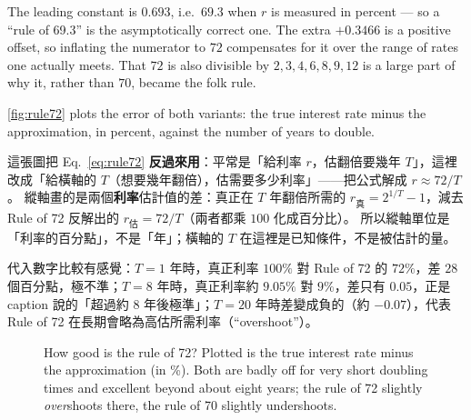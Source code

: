 \begin{remark}
	The leading constant is $0.693$, i.e.\ $69.3$ when $r$ is measured in percent --- so a ``rule of 69.3'' is the asymptotically correct one.
	The extra $+0.3466$ is a positive offset, so inflating the numerator to $72$ compensates for it over the range of rates one actually meets.
	That $72$ is also divisible by $2,3,4,6,8,9,12$ is a large part of why it, rather than $70$, became the folk rule.
\end{remark}
\suppend

\autoref{fig:rule72} plots the error of both variants: the true interest rate minus the approximation, in percent, against the number of years to double.

\suppstart
\begin{remark}
	這張圖把 Eq.~\eqref{eq:rule72} \textbf{反過來用}：平常是「給利率 $r$，估翻倍要幾年 $T$」，這裡改成「給橫軸的 $T$（想要幾年翻倍），估需要多少利率」——把公式解成 $r\approx 72/T$。
	縱軸畫的是兩個\textbf{利率}估計值的差：真正在 $T$ 年翻倍所需的 $r_{\text{真}}=2^{1/T}-1$，減去 Rule of 72 反解出的 $r_{\text{估}}=72/T$（兩者都乘 $100$ 化成百分比）。
	所以縱軸單位是「利率的百分點」，不是「年」；橫軸的 $T$ 在這裡是已知條件，不是被估計的量。

	代入數字比較有感覺：$T=1$ 年時，真正利率 $100\%$ 對 Rule of 72 的 $72\%$，差 $28$ 個百分點，極不準；$T=8$ 年時，真正利率約 $9.05\%$ 對 $9\%$，差只有 $0.05$，正是 caption 說的「超過約 8 年後極準」；$T=20$ 年時差變成負的（約 $-0.07$），代表 Rule of 72 在長期會略為高估所需利率（``overshoot''）。
\end{remark}
\suppend

\begin{figure}[H]
	\centering
	\caption{How good is the rule of 72? Plotted is the true interest rate
		minus the approximation (in \%). Both are badly off for very short
		doubling times and excellent beyond about eight years; the rule of 72
		slightly \emph{over}shoots there, the rule of 70 slightly undershoots.}
	\label{fig:rule72}
\end{figure}


